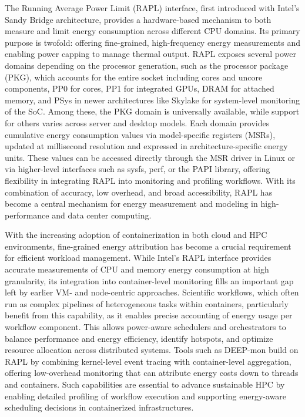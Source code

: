 The Running Average Power Limit (RAPL) interface, first introduced with Intel’s Sandy Bridge architecture, provides a hardware-based mechanism to both measure and limit energy consumption across different CPU domains. Its primary purpose is twofold: offering fine-grained, high-frequency energy measurements and enabling power capping to manage thermal output. RAPL exposes several power domains depending on the processor generation, such as the processor package (PKG), which accounts for the entire socket including cores and uncore components, PP0 for cores, PP1 for integrated GPUs, DRAM for attached memory, and PSys in newer architectures like Skylake for system-level monitoring of the SoC. Among these, the PKG domain is universally available, while support for others varies across server and desktop models. Each domain provides cumulative energy consumption values via model-specific registers (MSRs), updated at millisecond resolution and expressed in architecture-specific energy units. These values can be accessed directly through the MSR driver in Linux or via higher-level interfaces such as sysfs, perf, or the PAPI library, offering flexibility in integrating RAPL into monitoring and profiling workflows. With its combination of accuracy, low overhead, and broad accessibility, RAPL has become a central mechanism for energy measurement and modeling in high-performance and data center computing.

With the increasing adoption of containerization in both cloud and HPC environments, fine-grained energy attribution has become a crucial requirement for efficient workload management. While Intel’s RAPL interface provides accurate measurements of CPU and memory energy consumption at high granularity, its integration into container-level monitoring fills an important gap left by earlier VM- and node-centric approaches. Scientific workflows, which often run as complex pipelines of heterogeneous tasks within containers, particularly benefit from this capability, as it enables precise accounting of energy usage per workflow component. This allows power-aware schedulers and orchestrators to balance performance and energy efficiency, identify hotspots, and optimize resource allocation across distributed systems. Tools such as DEEP-mon build on RAPL by combining kernel-level event tracing with container-level aggregation, offering low-overhead monitoring that can attribute energy costs down to threads and containers. Such capabilities are essential to advance sustainable HPC by enabling detailed profiling of workflow execution and supporting energy-aware scheduling decisions in containerized infrastructures.


